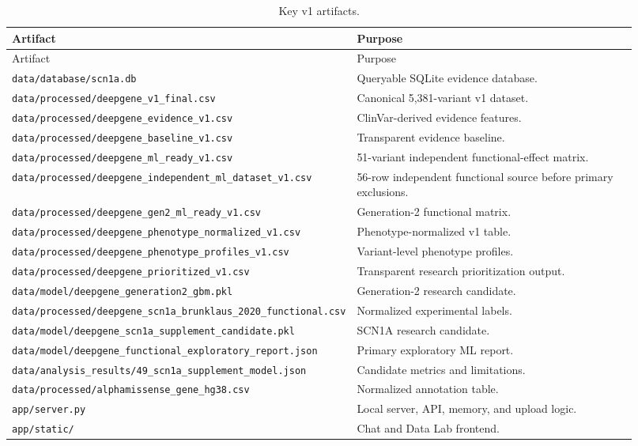 \documentclass[12pt,a4paper]{article}
\newcommand{\code}[1]{\nolinkurl{#1}}
\begin{document}
\begin{longtable}{p{0.39\linewidth}p{0.53\linewidth}}
\caption{Key v1 artifacts.}\\
\toprule
Artifact & Purpose\\
\midrule
\endfirsthead
\toprule
Artifact & Purpose\\
\midrule
\endhead
\code{data/database/scn1a.db} & Queryable SQLite evidence database.\\
\code{data/processed/deepgene\_v1\_final.csv} & Canonical 5,381-variant v1 dataset.\\
\code{data/processed/deepgene\_evidence\_v1.csv} & ClinVar-derived evidence features.\\
\code{data/processed/deepgene\_baseline\_v1.csv} & Transparent evidence baseline.\\
\code{data/processed/deepgene\_ml\_ready\_v1.csv} & 51-variant independent functional-effect matrix.\\
\code{data/processed/deepgene\_independent\_ml\_dataset\_v1.csv} & 56-row independent functional source before primary exclusions.\\
\code{data/processed/deepgene\_gen2\_ml\_ready\_v1.csv} & Generation-2 functional matrix.\\
\code{data/processed/deepgene\_phenotype\_normalized\_v1.csv} & Phenotype-normalized v1 table.\\
\code{data/processed/deepgene\_phenotype\_profiles\_v1.csv} & Variant-level phenotype profiles.\\
\code{data/processed/deepgene\_prioritized\_v1.csv} & Transparent research prioritization output.\\
\code{data/model/deepgene\_generation2\_gbm.pkl} & Generation-2 research candidate.\\
\code{data/processed/deepgene\_scn1a\_brunklaus\_2020\_functional.csv} & Normalized experimental labels.\\
\code{data/model/deepgene\_scn1a\_supplement\_candidate.pkl} & SCN1A research candidate.\\
\code{data/model/deepgene\_functional\_exploratory\_report.json} & Primary exploratory ML report.\\
\code{data/analysis\_results/49\_scn1a\_supplement\_model.json} & Candidate metrics and limitations.\\
\code{data/processed/alphamissense\_gene\_hg38.csv} & Normalized annotation table.\\
\code{app/server.py} & Local server, API, memory, and upload logic.\\
\code{app/static/} & Chat and Data Lab frontend.\\
\bottomrule
\end{longtable}
\end{document}
